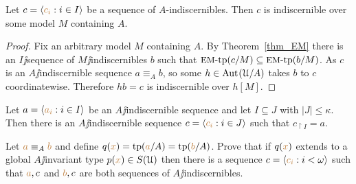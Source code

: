 \documentclass[creche.tex]{subfiles}
\begin{document}
\begin{proposition}\label{prop_indiscernibles_set_model}
  Let $c=\langle{\color{brown}c_i}:i\in I\rangle$ be a sequence of $A$-indiscernibles. Then $c$ is indiscernible over some model $M$ containing $A$.
\end{proposition}

\begin{proof}
  Fix an arbitrary model $M$ containing $A$. By Theorem~\ref{thm_EM} there is an $I\jj$sequence of $M\jj$indiscernibles $b$ such that $\textrm{{\small EM}\mbox{-}tp}(c/M)\subseteq\textrm{{\small EM}\mbox{-}tp}(b/M)$. As $c$ is an $A\jj$indiscernible sequence $a\equiv_Ab$, so some $h\in\textrm{Aut\kern.15ex}(\EuScript U/A)$ takes $b$ to $c$ coordinatewise. Therefore $hb=c$ is indiscernible over $h[M]$.
\end{proof}

\begin{exercise}
Let $a=\langle{\color{brown}a_i}:i\in I\rangle$ be an $A\jj$indiscernible sequence and let $I\subseteq J$ with $|J|\le \kappa$. Then there is an $A\jj$indiscernible sequence $c=\langle{\color{brown}c_i}:i\in J\rangle$ such that $c_{\restriction I}=a$.\QED
\end{exercise}

\begin{exercise}
  Let ${\color{brown} a}\equiv_A{\color{brown} b}$ and define $q({\color{brown} x})={\rm tp}({\color{brown} a}/A)={\rm tp}({\color{brown} b}/A)$. Prove that if $q({\color{brown} x})$ extends to a global $A\jj$invariant type $p({\color{brown} x})\in S(\EuScript U)$ then there is a sequence $c=\langle{\color{brown}c_i}:i<\omega\rangle$ such that ${\color{brown} a},c$ and ${\color{brown} b},c$ are both sequences of $A\jj$indiscernibles.\QED
\end{exercise}
\end{document}
